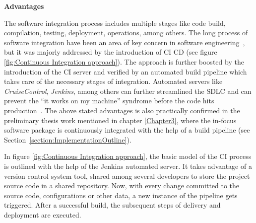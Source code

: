 \vspace{0.5cm}
\noindent \textbf{Advantages}
\vspace{0.5cm}

\noindent The software integration process includes multiple stages like code build, compilation, testing, deployment, operations, among others. The long process of software integration have been an area of key concern in software engineering~\parencite{vasilescu2015quality}, but it was majorly addressed by the introduction of \ac{CI} \ac{CD} (see figure \ref{fig:Continuous Integration approach}). The approach is further boosted by the introduction of the \ac{CI} server and verified by an automated build pipeline which takes care of the necessary stages of integration. Automated servers like \emph{CruiseControl}, \emph{Jenkins}, among others can further streamlined the \ac{SDLC} and can prevent the “it works on my machine” syndrome  before the code hits production~\parencite{6802994}. The above stated advantages is also practically confirmed in the preliminary thesis work mentioned in chapter \ref{Chapter3}, where the in-focus software package is continuously integrated with the help of a build pipeline (see Section~\ref{section:ImplementationOutline}).


In figure \ref{fig:Continuous Integration approach}, the basic model of the {\ac{CI}} process is outlined with the help of the Jenkins automated server. It takes advantage of a version control system tool, shared among several developers to store the project source code in a shared repository. Now, with every change committed to the source code, configurations or other data, a new instance of the pipeline gets triggered. After a successful build, the subsequent steps of delivery and deployment are executed.  

